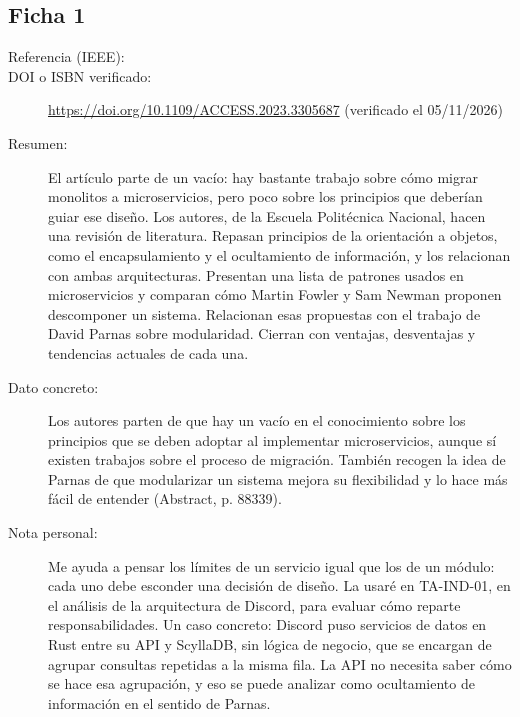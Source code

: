 \subsection{Ficha 1}
\begin{description}
  \item[Referencia (IEEE):] 
  \item[DOI o ISBN verificado:] \url{https://doi.org/10.1109/ACCESS.2023.3305687} (verificado el 05/11/2026)
  \item[Resumen:] El artículo parte de un vacío: hay bastante trabajo sobre cómo migrar monolitos a microservicios, pero poco sobre los principios que deberían guiar ese diseño. Los autores, de la Escuela Politécnica Nacional, hacen una revisión de literatura. Repasan principios de la orientación a objetos, como el encapsulamiento y el ocultamiento de información, y los relacionan con ambas arquitecturas. Presentan una lista de patrones usados en microservicios y comparan cómo Martin Fowler y Sam Newman proponen descomponer un sistema. Relacionan esas propuestas con el trabajo de David Parnas sobre modularidad. Cierran con ventajas, desventajas y tendencias actuales de cada una.
  \item[Dato concreto:] Los autores parten de que hay un vacío en el conocimiento sobre los principios que se deben adoptar al implementar microservicios, aunque sí existen trabajos sobre el proceso de migración. También recogen la idea de Parnas de que modularizar un sistema mejora su flexibilidad y lo hace más fácil de entender (Abstract, p. 88339).
  \item[Nota personal:] Me ayuda a pensar los límites de un servicio igual que los de un módulo: cada uno debe esconder una decisión de diseño. La usaré en TA-IND-01, en el análisis de la arquitectura de Discord, para evaluar cómo reparte responsabilidades. Un caso concreto: Discord puso servicios de datos en Rust entre su API y ScyllaDB, sin lógica de negocio, que se encargan de agrupar consultas repetidas a la misma fila. La API no necesita saber cómo se hace esa agrupación, y eso se puede analizar como ocultamiento de información en el sentido de Parnas.
\end{description}

